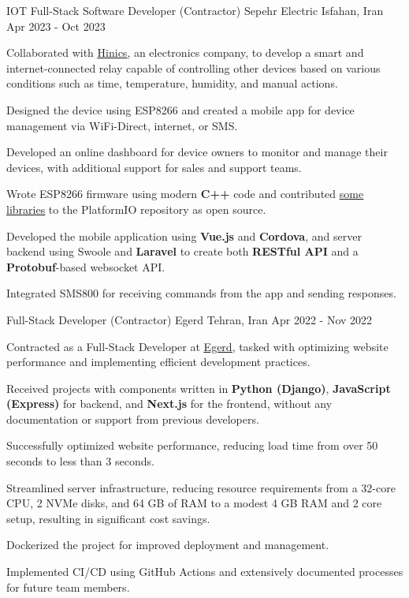 \begin{cventries}
  \cventry
    {IOT Full-Stack Software Developer (Contractor)} %
    {Sepehr Electric} %
    {Isfahan, Iran} %
    {Apr 2023 - Oct 2023} %
    {
      \begin{cvitems} %
        \item {Collaborated with \href{https://www.hinics.com/}{\underline{Hinics}}, an electronics company, to develop a smart and internet-connected relay capable of controlling other devices based on various conditions such as time, temperature, humidity, and manual actions.}
        \item {Designed the device using ESP8266 and created a mobile app for device management via WiFi-Direct, internet, or SMS.}
        \item {Developed an online dashboard for device owners to monitor and manage their devices, with additional support for sales and support teams.}
        \item {Wrote ESP8266 firmware using modern \textbf{C++} code and contributed \href{https://registry.platformio.org/search?q=owner\%3Ayeganemehr}{\underline{some libraries}} to the PlatformIO repository as open source.}
        \item {Developed the mobile application using \textbf{Vue.js} and \textbf{Cordova}, and server backend using Swoole and \textbf{Laravel} to create both \textbf{RESTful API} and a \textbf{Protobuf}-based websocket API.}
        \item {Integrated SMS800 for receiving commands from the app and sending responses.}
      \end{cvitems}
    }

  \cventry
    {Full-Stack Developer (Contractor)} %
    {Egerd} %
    {Tehran, Iran} %
    {Apr 2022 - Nov 2022} %
    {
      \begin{cvitems} %
        \item {Contracted as a Full-Stack Developer at \href{https://egerd.com/}{\underline{Egerd}}, tasked with optimizing website performance and implementing efficient development practices.}
        \item {Received projects with components written in \textbf{Python (Django)}, \textbf{JavaScript (Express)} for backend, and \textbf{Next.js} for the frontend, without any documentation or support from previous developers.}
        \item {Successfully optimized website performance, reducing load time from over 50 seconds to less than 3 seconds.}
        \item {Streamlined server infrastructure, reducing resource requirements from a 32-core CPU, 2 NVMe disks, and 64 GB of RAM to a modest 4 GB RAM and 2 core setup, resulting in significant cost savings.}
        \item {Dockerized the project for improved deployment and management.}
        \item {Implemented CI/CD using GitHub Actions and extensively documented processes for future team members.}
      \end{cvitems}
    }
  

\end{cventries}
